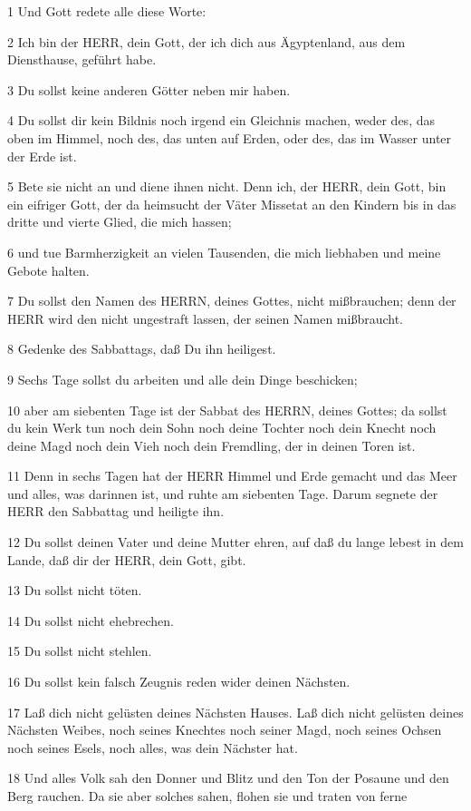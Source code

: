 \par 1 Und Gott redete alle diese Worte:
\par 2 Ich bin der HERR, dein Gott, der ich dich aus Ägyptenland, aus dem Diensthause, geführt habe.
\par 3 Du sollst keine anderen Götter neben mir haben.
\par 4 Du sollst dir kein Bildnis noch irgend ein Gleichnis machen, weder des, das oben im Himmel, noch des, das unten auf Erden, oder des, das im Wasser unter der Erde ist.
\par 5 Bete sie nicht an und diene ihnen nicht. Denn ich, der HERR, dein Gott, bin ein eifriger Gott, der da heimsucht der Väter Missetat an den Kindern bis in das dritte und vierte Glied, die mich hassen;
\par 6 und tue Barmherzigkeit an vielen Tausenden, die mich liebhaben und meine Gebote halten.
\par 7 Du sollst den Namen des HERRN, deines Gottes, nicht mißbrauchen; denn der HERR wird den nicht ungestraft lassen, der seinen Namen mißbraucht.
\par 8 Gedenke des Sabbattags, daß Du ihn heiligest.
\par 9 Sechs Tage sollst du arbeiten und alle dein Dinge beschicken;
\par 10 aber am siebenten Tage ist der Sabbat des HERRN, deines Gottes; da sollst du kein Werk tun noch dein Sohn noch deine Tochter noch dein Knecht noch deine Magd noch dein Vieh noch dein Fremdling, der in deinen Toren ist.
\par 11 Denn in sechs Tagen hat der HERR Himmel und Erde gemacht und das Meer und alles, was darinnen ist, und ruhte am siebenten Tage. Darum segnete der HERR den Sabbattag und heiligte ihn.
\par 12 Du sollst deinen Vater und deine Mutter ehren, auf daß du lange lebest in dem Lande, daß dir der HERR, dein Gott, gibt.
\par 13 Du sollst nicht töten.
\par 14 Du sollst nicht ehebrechen.
\par 15 Du sollst nicht stehlen.
\par 16 Du sollst kein falsch Zeugnis reden wider deinen Nächsten.
\par 17 Laß dich nicht gelüsten deines Nächsten Hauses. Laß dich nicht gelüsten deines Nächsten Weibes, noch seines Knechtes noch seiner Magd, noch seines Ochsen noch seines Esels, noch alles, was dein Nächster hat.
\par 18 Und alles Volk sah den Donner und Blitz und den Ton der Posaune und den Berg rauchen. Da sie aber solches sahen, flohen sie und traten von ferne

